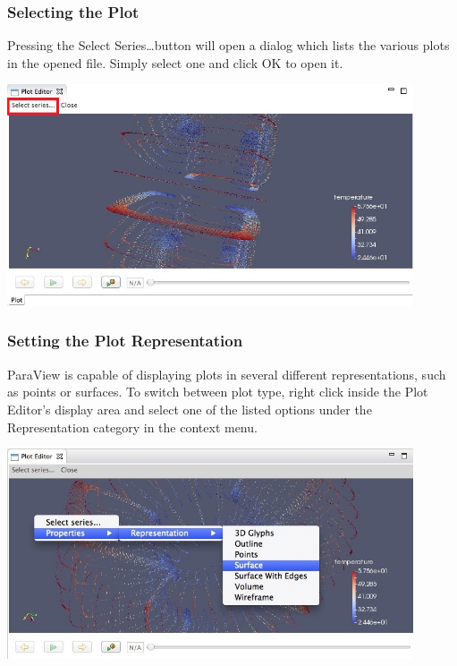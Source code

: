 \subsubsection{Selecting the Plot}

Pressing the Select Series\ldots button will open a dialog which lists the
various plots in the opened file. Simply select one and click OK to open it. 

\begin{center}
\includegraphics[width=12cm]{images/ParaViewPlotEditorSelectSeriesButton}
\end{center}

\subsubsection{Setting the Plot Representation} 

ParaView is capable of displaying plots in several different representations,
such as points or surfaces. To switch between plot type, right click inside the Plot
Editor's display area and select one of the listed options under the
Representation category in the context menu.

\begin{center}
\includegraphics[width=12cm]{images/ParaViewRepresentationDropDown}
\end{center}

